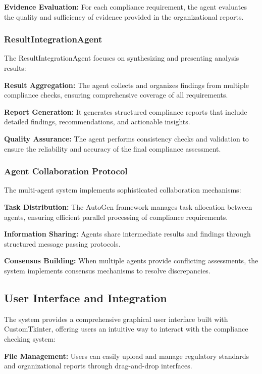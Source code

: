 \documentclass[conference]{IEEEtran}
\begin{document}
\textbf{Evidence Evaluation:} For each compliance requirement, the agent evaluates the quality and sufficiency of evidence provided in the organizational reports.

\subsubsection{ResultIntegrationAgent}
The ResultIntegrationAgent focuses on synthesizing and presenting analysis results:

\textbf{Result Aggregation:} The agent collects and organizes findings from multiple compliance checks, ensuring comprehensive coverage of all requirements.

\textbf{Report Generation:} It generates structured compliance reports that include detailed findings, recommendations, and actionable insights.

\textbf{Quality Assurance:} The agent performs consistency checks and validation to ensure the reliability and accuracy of the final compliance assessment.

\subsubsection{Agent Collaboration Protocol}
The multi-agent system implements sophisticated collaboration mechanisms:

\textbf{Task Distribution:} The AutoGen framework manages task allocation between agents, ensuring efficient parallel processing of compliance requirements.

\textbf{Information Sharing:} Agents share intermediate results and findings through structured message passing protocols.

\textbf{Consensus Building:} When multiple agents provide conflicting assessments, the system implements consensus mechanisms to resolve discrepancies.

\subsection{User Interface and Integration}

The system provides a comprehensive graphical user interface built with CustomTkinter, offering users an intuitive way to interact with the compliance checking system:

\textbf{File Management:} Users can easily upload and manage regulatory standards and organizational reports through drag-and-drop interfaces.
\end{document}
